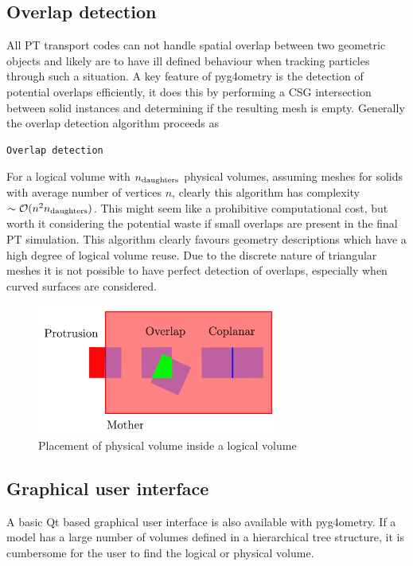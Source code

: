 \documentclass[final,5p,times,twocolumn]{elsarticle}
\begin{document}
\subsection{Overlap detection}
All PT transport codes can not handle spatial overlap between two geometric objects and likely are to have ill defined behaviour when tracking particles  
through such a situation.  A key feature of pyg4ometry is the detection of potential overlaps efficiently, it does this by performing a CSG intersection between solid instances 
and determining if the resulting mesh is empty. Generally the overlap detection algorithm proceeds as 

{\small 
\begin{verbatim}
Overlap detection
\end{verbatim}
} 

For a logical volume with $n_{\rm daughters}$ physical volumes, assuming meshes for solids with average number of vertices $n$, clearly this algorithm has complexity $\sim \mathcal{O}(n^2 n_{\rm daughters})$. This might seem like a prohibitive computational cost, but worth it considering the potential waste if small overlaps are present in the final 
PT simulation. This algorithm clearly favours geometry descriptions which have a high degree of logical volume reuse. Due to the discrete nature of triangular meshes it is not possible to have perfect detection of overlaps, especially when curved surfaces are considered. 
 \begin{figure}[htbp]
\begin{center}
\includegraphics[width=8cm]{./diagrams/overlap.pdf}
\caption{Placement of physical volume inside a logical volume}
\label{fig:lvToPv}
\end{center}
\end{figure} 

\subsection{Graphical user interface}
A basic Qt based graphical user interface is also available with pyg4ometry. If a model has a large number of volumes defined in a hierarchical tree structure, it is cumbersome for the user to find the logical or physical volume.    
\end{document}
